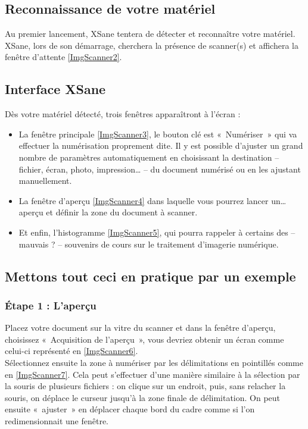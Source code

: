 \subsection{Reconnaissance de votre matériel}
Au premier lancement, XSane tentera de détecter et reconnaître votre matériel. XSane, lors de son démarrage, cherchera la présence de scanner(s) et affichera la fenêtre d'attente \ref{ImgScanner2}.
\subsection{Interface XSane}
Dès votre matériel détecté, trois fenêtres apparaîtront à l'écran : 
\ScannerPresentation
\begin{itemize}
\item La fenêtre principale \ref{ImgScanner3}, le bouton clé est «~Numériser~» qui va effectuer la numérisation proprement dite. Il y est possible d'ajuster un grand nombre de paramètres automatiquement en choisissant la destination -- fichier, écran, photo, impression\ldots{} -- du document numérisé ou en les ajustant manuellement.
\item La fenêtre d'aperçu \ref{ImgScanner4} dans laquelle vous pourrez lancer un\ldots{} aperçu et définir la zone du document à scanner.
\item Et enfin, l'histogramme \ref{ImgScanner5}, qui pourra rappeler à certains des -- mauvais ? -- souvenirs de cours sur le traitement d'imagerie numérique.
\end{itemize}
\subsection{Mettons tout ceci en pratique par un exemple}
\subsubsection{Étape 1 : L'aperçu}
Placez votre document sur la vitre du scanner et dans la fenêtre d'aperçu, choisissez «~Acquisition de l'aperçu~», vous devriez obtenir un écran comme celui-ci représenté en \ref{ImgScanner6}.\\
Sélectionnez ensuite la zone à numériser par les délimitations en pointillés comme en \ref{ImgScanner7}. Cela peut s'effectuer d'une manière similaire à la sélection par la souris de plusieurs fichiers : on clique sur un endroit, puis, sans relacher la souris, on déplace le curseur jusqu'à la zone finale de délimitation. On peut ensuite «~ajuster~» en déplacer chaque bord du cadre comme si l'on redimensionnait une fenêtre.\par
\ScannerEtapeUn
